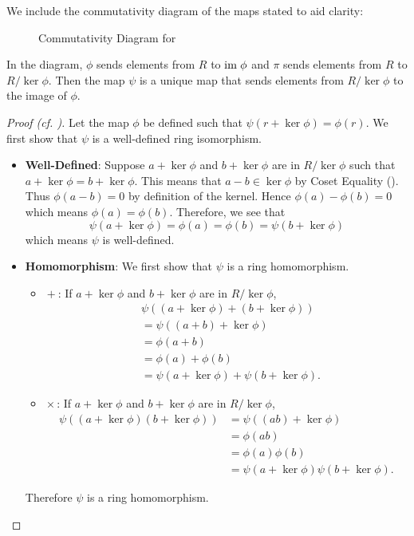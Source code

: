 \newpage

We include the commutativity diagram of the maps stated to aid clarity:
\begin{figure}[h]
    \centering
    \caption{Commutativity Diagram for }
\end{figure}

In the diagram, $\phi$ sends elements from $R$ to $\mathrm{im}\;\phi$ and $\pi$ sends elements from $R$ to $R/\ker\phi$. Then the map $\psi$ is a unique map that sends elements from $R/\ker\phi$ to the image of $\phi$.

\begin{proof}[Proof (cf. {\cite[p.~302, Factor Theorem For Rings]{cohn_1982}})]
    Let the map $\phi$ be defined such that $\psi(r + \ker\phi) = \phi(r)$. We first show that $\psi$ is a well-defined ring isomorphism.
    \begin{itemize}
        \item \textbf{Well-Defined}: Suppose $a + \ker\phi$ and $b + \ker\phi$ are in $R/\ker\phi$ such that $a + \ker\phi = b+\ker\phi$. This means that $a - b \in \ker\phi$ by Coset Equality (). Thus $\phi(a-b) = 0$ by definition of the kernel. Hence $\phi(a) - \phi(b) = 0$ which means $\phi(a) = \phi(b)$. Therefore, we see that
        \[
            \psi(a + \ker\phi) = \phi(a) = \phi(b) = \psi(b + \ker\phi)
        \]
        which means $\psi$ is well-defined.

        \item \textbf{Homomorphism}: We first show that $\psi$ is a ring homomorphism.
        \begin{itemize}
            \item $\boxed{+}$: If $a + \ker\phi$ and $b + \ker\phi$ are in $R/\ker\phi$,
            \begin{align*}
                &\psi((a + \ker\phi)+(b+\ker\phi))\\
                &= \psi((a+b)+\ker\phi)\\
                &= \phi(a+b)\\
                &= \phi(a) + \phi(b)\\
                &= \psi(a + \ker\phi) + \psi(b + \ker\phi).
            \end{align*}
            \item $\boxed{\times}$: If $a + \ker\phi$ and $b + \ker\phi$ are in $R/\ker\phi$,
            \begin{align*}
                \psi((a + \ker\phi)(b+\ker\phi)) &= \psi((ab)+\ker\phi)\\
                &= \phi(ab)\\
                &= \phi(a)\phi(b)\\
                &= \psi(a + \ker\phi)\psi(b + \ker\phi).
            \end{align*}
        \end{itemize}
        Therefore $\psi$ is a ring homomorphism.


\end{itemize}
\end{proof}
